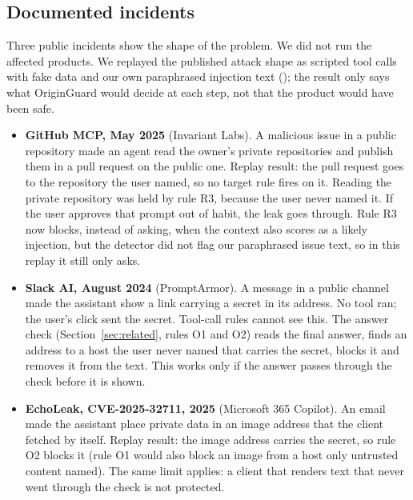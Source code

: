 \documentclass[11pt,a4paper]{article}
\newcommand{\code}[1]{\texttt{\detokenize{#1}}}
\begin{document}
\subsection{Documented incidents}
Three public incidents show the shape of the problem. We did not run the affected products. We replayed the published attack shape as scripted tool calls with fake data and our own paraphrased injection text (\code{demo/incidents.py}); the result only says what OriginGuard would decide at each step, not that the product would have been safe.
\begin{itemize}
  \item \textbf{GitHub MCP, May 2025} (Invariant Labs). A malicious issue in a public repository made an agent read the owner's private repositories and publish them in a pull request on the public one. Replay result: the pull request goes to the repository the user named, so no target rule fires on it. Reading the private repository was held by rule R3, because the user never named it. If the user approves that prompt out of habit, the leak goes through. Rule R3 now blocks, instead of asking, when the context also scores as a likely injection, but the detector did not flag our paraphrased issue text, so in this replay it still only asks.
  \item \textbf{Slack AI, August 2024} (PromptArmor). A message in a public channel made the assistant show a link carrying a secret in its address. No tool ran; the user's click sent the secret. Tool-call rules cannot see this. The answer check (Section~\ref{sec:related}, rules O1 and O2) reads the final answer, finds an address to a host the user never named that carries the secret, blocks it and removes it from the text. This works only if the answer passes through the check before it is shown.
  \item \textbf{EchoLeak, CVE-2025-32711, 2025} (Microsoft 365 Copilot). An email made the assistant place private data in an image address that the client fetched by itself. Replay result: the image address carries the secret, so rule O2 blocks it (rule O1 would also block an image from a host only untrusted content named). The same limit applies: a client that renders text that never went through the check is not protected.
\end{itemize}
\end{document}

